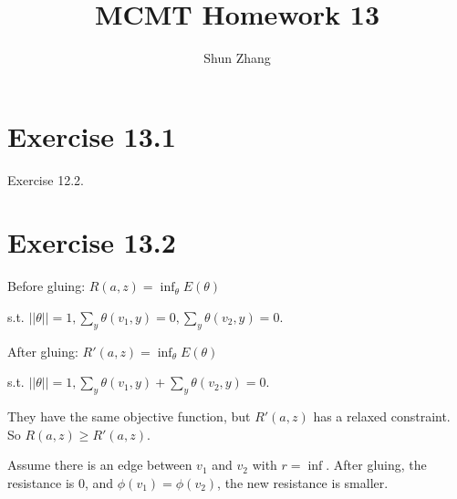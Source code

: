 \documentclass[10pt]{article}
\title{MCMT Homework 13}
\author{Shun Zhang}
\date{}
\begin{document}
\maketitle

\section*{Exercise 13.1}

Exercise 12.2.

\section*{Exercise 13.2}

Before gluing: $R(a, z) = \inf_\theta E(\theta)$

s.t. $||\theta|| = 1,
\sum_y \theta(v_1, y) = 0,
\sum_y \theta(v_2, y) = 0
$.

After gluing:  $R'(a, z) = \inf_\theta E(\theta)$

s.t. $||\theta|| = 1,
\sum_y \theta(v_1, y) + \sum_y \theta(v_2, y) = 0
$.

They have the same objective function, but $R'(a, z)$ has a relaxed constraint.
So $R(a, z) \geq R'(a, z)$.

\hfill

Assume there is an edge between $v_1$ and $v_2$ with $r = \inf$. After gluing,
the resistance is $0$, and $\phi(v_1) = \phi(v_2)$, the new resistance is
smaller. 
\end{document}
